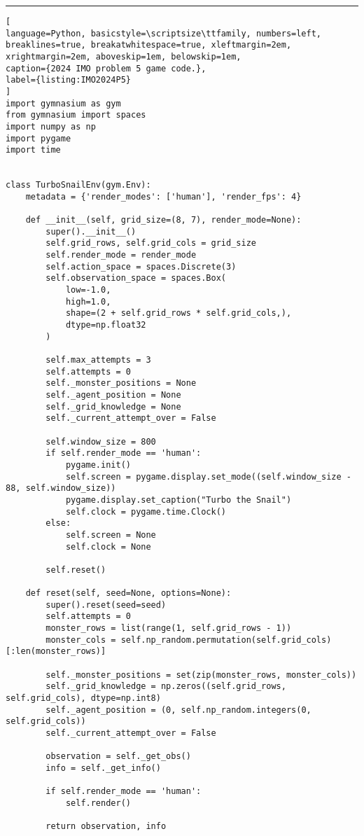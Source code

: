 \hrule
\begin{lstlisting}[
language=Python, basicstyle=\scriptsize\ttfamily, numbers=left, breaklines=true, breakatwhitespace=true, xleftmargin=2em, xrightmargin=2em, aboveskip=1em, belowskip=1em,
caption={2024 IMO problem 5 game code.},
label={listing:IMO2024P5}
]
import gymnasium as gym
from gymnasium import spaces
import numpy as np
import pygame
import time


class TurboSnailEnv(gym.Env):
    metadata = {'render_modes': ['human'], 'render_fps': 4}

    def __init__(self, grid_size=(8, 7), render_mode=None):
        super().__init__()
        self.grid_rows, self.grid_cols = grid_size
        self.render_mode = render_mode
        self.action_space = spaces.Discrete(3)
        self.observation_space = spaces.Box(
            low=-1.0,
            high=1.0,
            shape=(2 + self.grid_rows * self.grid_cols,),
            dtype=np.float32
        )

        self.max_attempts = 3
        self.attempts = 0
        self._monster_positions = None
        self._agent_position = None
        self._grid_knowledge = None
        self._current_attempt_over = False

        self.window_size = 800
        if self.render_mode == 'human':
            pygame.init()
            self.screen = pygame.display.set_mode((self.window_size - 88, self.window_size))
            pygame.display.set_caption("Turbo the Snail")
            self.clock = pygame.time.Clock()
        else:
            self.screen = None
            self.clock = None

        self.reset()

    def reset(self, seed=None, options=None):
        super().reset(seed=seed)
        self.attempts = 0
        monster_rows = list(range(1, self.grid_rows - 1))
        monster_cols = self.np_random.permutation(self.grid_cols)[:len(monster_rows)]

        self._monster_positions = set(zip(monster_rows, monster_cols))
        self._grid_knowledge = np.zeros((self.grid_rows, self.grid_cols), dtype=np.int8)
        self._agent_position = (0, self.np_random.integers(0, self.grid_cols))
        self._current_attempt_over = False

        observation = self._get_obs()
        info = self._get_info()

        if self.render_mode == 'human':
            self.render()

        return observation, info


\end{lstlisting}
